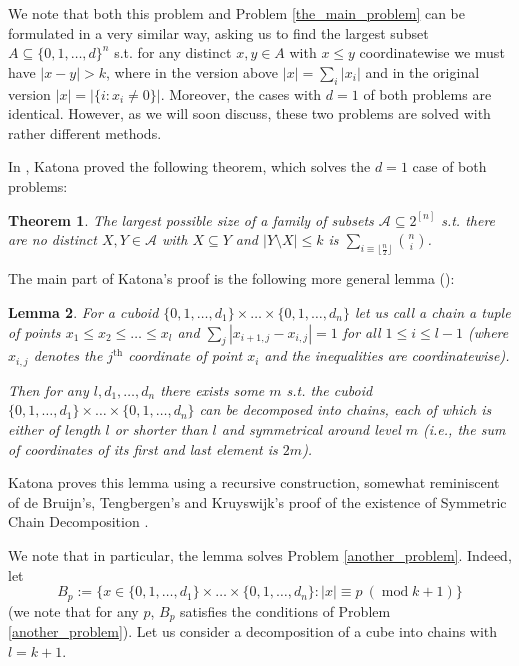 \documentclass[11pt, reqno]{amsart}
\newtheorem{theorem}{Theorem}
\newtheorem{lemma}[theorem]{Lemma}
\numberwithin{equation}{section}
\newcommand\modd{\operatorname{mod}}
\begin{document}
We note that both this problem and Problem \ref{the_main_problem} can be formulated in a very similar way, asking us to find the largest subset $A \subseteq \{0, 1, \dots, d\}^n$ s.t. for any distinct $x, y \in A$ with $x \leqslant y$ coordinatewise we must have $|x-y|>k$, where in the version above $|x|=\sum_i |x_i|$ and in the original version $|x|=|\{i : x_i \neq 0\}|$. Moreover, the cases with $d=1$ of both problems are identical. However, as we will soon discuss, these two problems are solved with rather different methods.

In \cite{katona}, Katona proved the following theorem, which solves the $d=1$ case of both problems:

\begin{theorem}
\label{katona_theorem}
    The largest possible size of a family of subsets $\mathcal{A} \subseteq 2^{[n]}$ s.t. there are no distinct $X, Y \in \mathcal{A}$ with $X \subseteq Y$ and $|Y \setminus X| \leq k$ is $\sum_{i \equiv \lfloor \frac{n}{2} \rfloor} \binom{n}{i}$.
\end{theorem}

The main part of Katona's proof is the following more general lemma (\cite[Theorem 1]{katona}):

\begin{lemma}
\label{katona_lemma}
    For a cuboid $\{0, 1, \dots, d_1\} \times \dots \times \{0, 1, \dots, d_n\}$ let us call a \emph{chain} a tuple of points $x_1 \leqslant x_2 \leqslant \dots \leqslant x_l$ and $\sum_j |x_{i+1, j} - x_{i, j}|=1$ for all $1 \leqslant i \leqslant l-1$ (where $x_{i,j}$ denotes the $j^{\text{th}}$ coordinate of point $x_i$ and the inequalities are coordinatewise).

    Then for any $l, d_1, \dots, d_n$ there exists some $m$ s.t. the cuboid $\{0, 1, \dots, d_1\} \times \dots \times \{0, 1, \dots, d_n\}$ can be decomposed into chains, each of which is either of length $l$ or shorter than $l$ and symmetrical around level $m$ (i.e., the sum of coordinates of its first and last element is $2m$).
\end{lemma}

Katona proves this lemma using a recursive construction, somewhat reminiscent of de Bruijn's, Tengbergen's and Kruyswijk's proof of the existence of Symmetric Chain Decomposition \cite{symmetric_chain_decomposition}.

We note that in particular, the lemma solves Problem \ref{another_problem}. Indeed, let
\begin{equation*}
    B_p := \Big\{ x \in \{0, 1, \dots, d_1\} \times \dots \times \{0, 1, \dots, d_n\} : |x| \equiv p \ (\modd k+1) \Big\}
\end{equation*}
(we note that for any $p$, $B_p$ satisfies the conditions of Problem \ref{another_problem}). Let us consider a decomposition of a cube into chains with $l=k+1$.
\end{document}
